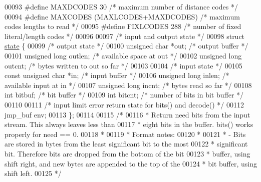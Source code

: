 \begin{DoxyCode}
00093 \textcolor{preprocessor}{#define MAXDCODES 30            }\textcolor{comment}{/* maximum number of distance codes */}\textcolor{preprocessor}{}
00094 \textcolor{preprocessor}{#define MAXCODES (MAXLCODES+MAXDCODES)  }\textcolor{comment}{/* maximum codes lengths to read */}\textcolor{preprocessor}{}
00095 \textcolor{preprocessor}{#define FIXLCODES 288           }\textcolor{comment}{/* number of fixed literal/length codes */}\textcolor{preprocessor}{}
00096 
00097 \textcolor{comment}{/* input and output state */}
00098 \textcolor{keyword}{struct }\hyperlink{structstate}{state} \{
00099     \textcolor{comment}{/* output state */}
00100     \textcolor{keywordtype}{unsigned} \textcolor{keywordtype}{char} *out;         \textcolor{comment}{/* output buffer */}
00101     \textcolor{keywordtype}{unsigned} \textcolor{keywordtype}{long} outlen;       \textcolor{comment}{/* available space at out */}
00102     \textcolor{keywordtype}{unsigned} \textcolor{keywordtype}{long} outcnt;       \textcolor{comment}{/* bytes written to out so far */}
00103 
00104     \textcolor{comment}{/* input state */}
00105     \textcolor{keyword}{const} \textcolor{keywordtype}{unsigned} \textcolor{keywordtype}{char} *in;    \textcolor{comment}{/* input buffer */}
00106     \textcolor{keywordtype}{unsigned} \textcolor{keywordtype}{long} inlen;        \textcolor{comment}{/* available input at in */}
00107     \textcolor{keywordtype}{unsigned} \textcolor{keywordtype}{long} incnt;        \textcolor{comment}{/* bytes read so far */}
00108     \textcolor{keywordtype}{int} bitbuf;                 \textcolor{comment}{/* bit buffer */}
00109     \textcolor{keywordtype}{int} bitcnt;                 \textcolor{comment}{/* number of bits in bit buffer */}
00110 
00111     \textcolor{comment}{/* input limit error return state for bits() and decode() */}
00112     jmp\_buf env;
00113 \};
00114 
00115 \textcolor{comment}{/*}
00116 \textcolor{comment}{ * Return need bits from the input stream.  This always leaves less than}
00117 \textcolor{comment}{ * eight bits in the buffer.  bits() works properly for need == 0.}
00118 \textcolor{comment}{ *}
00119 \textcolor{comment}{ * Format notes:}
00120 \textcolor{comment}{ *}
00121 \textcolor{comment}{ * - Bits are stored in bytes from the least significant bit to the most}
00122 \textcolor{comment}{ *   significant bit.  Therefore bits are dropped from the bottom of the bit}
00123 \textcolor{comment}{ *   buffer, using shift right, and new bytes are appended to the top of the}
00124 \textcolor{comment}{ *   bit buffer, using shift left.}
00125 \textcolor{comment}{ */}

\end{DoxyCode}
